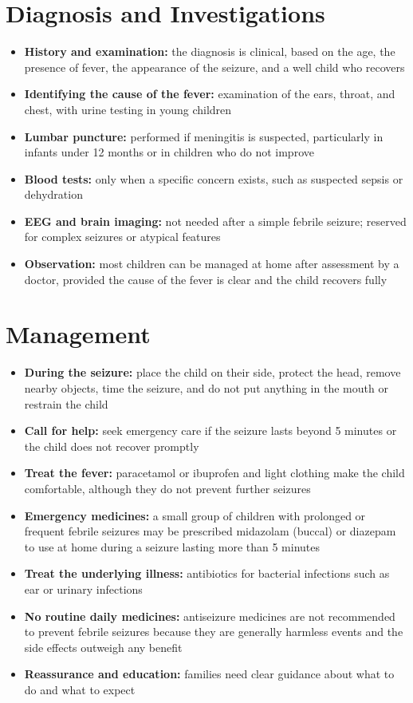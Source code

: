 \section*{Diagnosis and Investigations}
\begin{itemize}
    \item \textbf{History and examination:} the diagnosis is clinical, based on the age, the presence of fever, the appearance of the seizure, and a well child who recovers
    \item \textbf{Identifying the cause of the fever:} examination of the ears, throat, and chest, with urine testing in young children
    \item \textbf{Lumbar puncture:} performed if meningitis is suspected, particularly in infants under 12 months or in children who do not improve
    \item \textbf{Blood tests:} only when a specific concern exists, such as suspected sepsis or dehydration
    \item \textbf{EEG and brain imaging:} not needed after a simple febrile seizure; reserved for complex seizures or atypical features
    \item \textbf{Observation:} most children can be managed at home after assessment by a doctor, provided the cause of the fever is clear and the child recovers fully
\end{itemize}

\section*{Management}
\begin{itemize}
    \item \textbf{During the seizure:} place the child on their side, protect the head, remove nearby objects, time the seizure, and do not put anything in the mouth or restrain the child
    \item \textbf{Call for help:} seek emergency care if the seizure lasts beyond 5 minutes or the child does not recover promptly
    \item \textbf{Treat the fever:} paracetamol or ibuprofen and light clothing make the child comfortable, although they do not prevent further seizures
    \item \textbf{Emergency medicines:} a small group of children with prolonged or frequent febrile seizures may be prescribed midazolam (buccal) or diazepam to use at home during a seizure lasting more than 5 minutes
    \item \textbf{Treat the underlying illness:} antibiotics for bacterial infections such as ear or urinary infections
    \item \textbf{No routine daily medicines:} antiseizure medicines are not recommended to prevent febrile seizures because they are generally harmless events and the side effects outweigh any benefit
    \item \textbf{Reassurance and education:} families need clear guidance about what to do and what to expect
\end{itemize}

